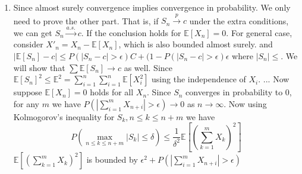 \documentclass{article}
\begin{document}
\begin{enumerate}
    \item Since almost surely convergence implies convergence
    in probability. We only need to prove the other part.
    That is, if $S_n \xrightarrow{p} c$ under the extra
    conditions, we can get $S_n \xrightarrow{a.s.} c$.
    If the conclusion holds for $\mathbb{E}[X_n]=0$.
    For general case, consider $X'_n = X_n -\mathbb{E}[X_n]$,
    which is also bounded almost surely. and
    $|\mathbb{E}[S_n] - c| \leq P(|S_n - c|>\epsilon) C +
    (1-P(|S_n - c|>\epsilon)\epsilon$ where $|S_n| \leq $.
    We will show that $\sum \mathbb{E}[S_n] \to c$ as well.
    Since $\mathbb{E}[S_n]^2 \leq \mathbb{E}^2 = \sum_{i=1}^n
    \sum_{i=1}^n \mathbb{E}[X_i^2]$ using the independence of
    $X_i$.
    ...
    Now suppose $\mathbb{E}[X_n]=0$ holds for all $X_n$.
    Since $S_n$ converges in probability to $0$,
    for any $m$ we have
    $P(|\sum_{i=1}^m X_{n+i}|>\epsilon) \to 0$ as $n\to \infty$.
    Now using Kolmogorov's inequality for $S_k,  n \leq k \leq n+m$ we have
    $$
    P(\max_{n\leq k \leq n+m} |S_k| \leq \delta)
    \leq \frac{1}{\delta^2} \mathbb{E}[(\sum_{k=1}^{m} X_k)^2]
    $$
    $\mathbb{E}[(\sum_{k=1}^{m} X_k)^2]$ is bounded by
    $\epsilon^2 + P(|\sum_{i=1}^m X_{n+i}|>\epsilon)$
       
\end{enumerate}
\end{document}
